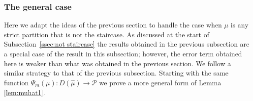 \documentclass{article}
\theoremstyle{plain}
\theoremstyle{definition}
\begin{document}

\subsubsection{The general case}\label{sssec:general}

Here we adapt the ideas of the previous section to handle the case when $\mu$ is any strict partition that is not the staircase. As discussed at the start of Subsection~\ref{ssec:not staircase} the results obtained in the previous subsection are a special case of the result in this subsection; however, the error term obtained here is weaker than what was obtained in the previous section.  We follow a similar strategy to that of the previous subsection. Starting with the same function $\Psi_m(\mu) : D(\hat \mu) \to \mathcal{P}$ we prove a more general form of Lemma \ref{lem:muhat1}. 
\end{document}
